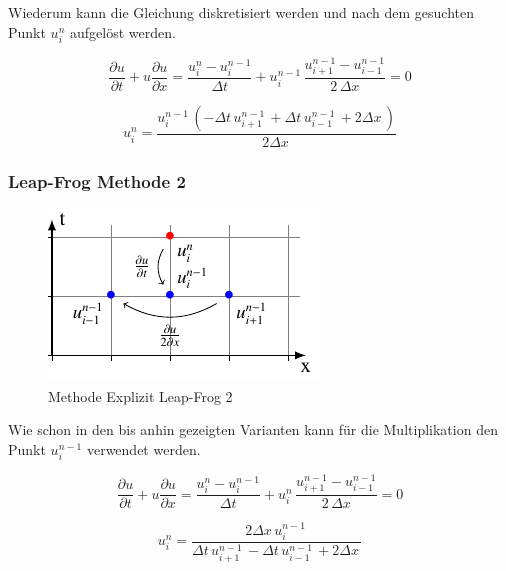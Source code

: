 	Wiederum kann die Gleichung diskretisiert werden und nach dem gesuchten Punkt $u_{i}^{n}$ aufgel\"ost werden.
	
	\begin{equation}
		\frac {\partial u}{\partial t}+u{\frac {\partial u}{\partial x}} = \frac{u_{i}^{n}-u_{i}^{n-1}}{\Delta t}+ u_{i}^{n-1}\, \frac{u_{i+1}^{n-1}-u_{i-1}^{n-1}}{2\,\Delta x}=0
		\label{burgers:eq_ex_lf1}
	\end{equation}

	\begin{equation}
	 u_{i}^{n} = \frac{u^{n-1}_{i}\, \left(- \Delta{t}\, u^{n-1}_{i+1}\, + \Delta{t}\, u^{n-1}_{i-1}\, + 2 \Delta{x}\,\right)}{2 \Delta{x}\,}
		\label{burgers:eq_ex_sol_lf1}
	\end{equation}

\subsubsection{Leap-Frog Methode 2}
     \begin{figure}
	\centering
	\includegraphics[height=.4\textwidth]{papers/burgers/BurgersEquation/tikz/Linear4/Linear4.pdf}
	\caption{Methode Explizit  Leap-Frog 2}
	\label{burgers:fig:Linear4}
	\end{figure}

	Wie schon in den bis anhin gezeigten Varianten kann f\"ur die Multiplikation den Punkt $u_{i}^{n-1}$ verwendet werden.

	\begin{equation}
	\frac {\partial u}{\partial t}+u{\frac {\partial u}{\partial x}} = \frac{u_{i}^{n}-u_{i}^{n-1}}{\Delta t}+ u_{i}^{n}\, \frac{u_{i+1}^{n-1}-u_{i-1}^{n-1}}{2\,\Delta x}=0
	\end{equation}
	
	\begin{equation}
	u_{i}^{n} = \frac{2 \Delta{x}\, u^{n-1}_{i}\,}{\Delta{t}\, u^{n-1}_{i+1}\, - \Delta{t}\, u^{n-1}_{i-1}\, + 2 \Delta{x}\,}
	\end{equation}

